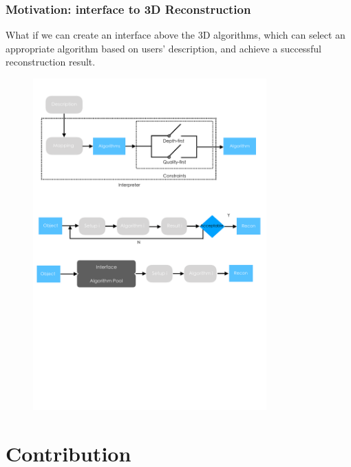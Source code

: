 \documentclass{beamer}
\begin{document}
\begin{frame}
\frametitle{Motivation: interface to 3D Reconstruction}
What if we can create an interface above the 3D algorithms, which can select an appropriate algorithm based on users' description, and achieve a successful reconstruction result.

\begin{figure}
\centering
\includegraphics[width=0.8\textwidth]{images/interface_3d_vision.pdf}
\end{figure}

\end{frame}

\section{Contribution}

\begin{frame}
\tableofcontents[currentsection,currentsubsection, 
    hideothersubsections, 
    sectionstyle=show/shaded,]
\end{frame}
\end{document}
